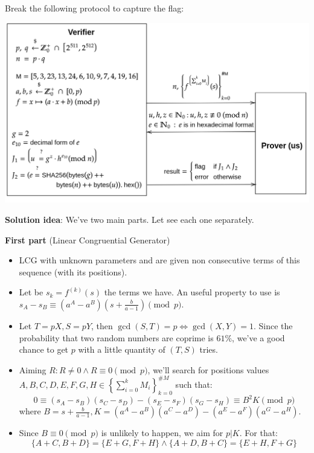\documentclass[a0paper,portrait]{baposter}
\begin{document}
\begin{poster}
{  Break the following protocol to capture the flag:
  \begin{center}
    \includegraphics[width=0.95\columnwidth]{samsara-protocol-black.png}
  \end{center}
  
  \vspace{-2em}
  \hhrule

  \vspace{-0.5em}
  {\large\textbf{Solution idea}}: We've two main parts. Let see each one separately.

  \vspace{0.5em}
  \textbf{First part} (Linear Congruential Generator)
  \begin{itemize}
    \item LCG with unknown parameters and are given non consecutive terms of
      this sequence (with its positions).
    \item Let be $s_k \! = \! f^{(k)}(s)$ the terms we have.
      An useful property to use is $s_A - s_B \equiv (a^A-a^B)\left(s+\frac{b}{a-1}\right)\pmod{p}$.
    \item Let $T \! = \! pX, S \! = \! pY$, then $\gcd(S,T) \! = \! p \! \iff \! \gcd(X,Y) \! = \! 1$.
      Since the probability that two random numbers are coprime is $61\%$,
      we've a good chance to get $p$ with a little quantity of $(T,S)$ tries.
    \item Aiming $R : R \! \neq \! 0 \land R \! \equiv \! 0 \pmod{p}$,
      we'll search for positions values $A,B,C,D,E,F,G,H \in \left\{\sum_{i=0}^k M_i\right\}_{k=0}^{\# M}$ such that:
      \begin{equation*}
          0 \equiv (s_A-s_B)(s_C-s_D)-(s_E-s_F)(s_G-s_H)
            \equiv B^2 K\pmod{p}
      \end{equation*}
      where $B = s+\frac{b}{a-1}, K = (a^A-a^B)(a^C-a^D)-(a^E-a^F)(a^G-a^H)$.
    \item Since $B \equiv 0 \pmod{p}$ is unlikely to happen, we aim for $p|K$. For that:
      \begin{equation*}
        \{A+C,B+D\} = \{E+G,F+H\} \land \{A+D,B+C\} = \{E+H,F+G\}
      \end{equation*}


\end{itemize}}
\end{poster}
\end{document}
